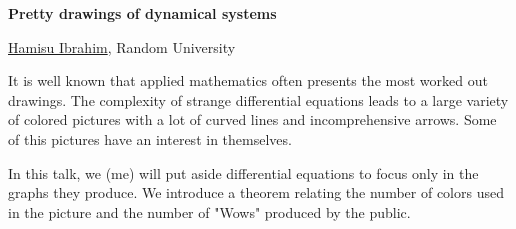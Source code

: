 \documentclass[a4paper, 11pt]{article}
\newcommand{\abstracttitle}[1]{{ \centering \LARGE \textbf{#1}\\ \vspace*{0.7cm} }}
\newcommand{\firstauthor}[2]{{ \centering \underline{#1}, \textsf{#2}\\ \vspace*{0.25cm} }}
\newcommand{\otherauthor}[2]{{ \centering #1, \textsf{#2}\\ \vspace*{0.25cm} }}
\newcommand{\abstracttext}[1]{ \vspace{0.6cm} #1 }
\begin{document}
\abstracttitle{Pretty drawings of dynamical systems}

\firstauthor{Hamisu Ibrahim}{Random University}

\abstracttext{
    It is well known that applied mathematics often presents the most worked out drawings. The complexity of strange differential equations leads to a large variety of colored pictures with a lot of curved lines and incomprehensive arrows. Some of this pictures have an interest in themselves.

    In this talk, we (me) will put aside differential equations to focus only in the graphs they produce. We introduce a theorem relating the number of colors used in the picture and the number of "Wows" produced by the public.
}

\end{document}
